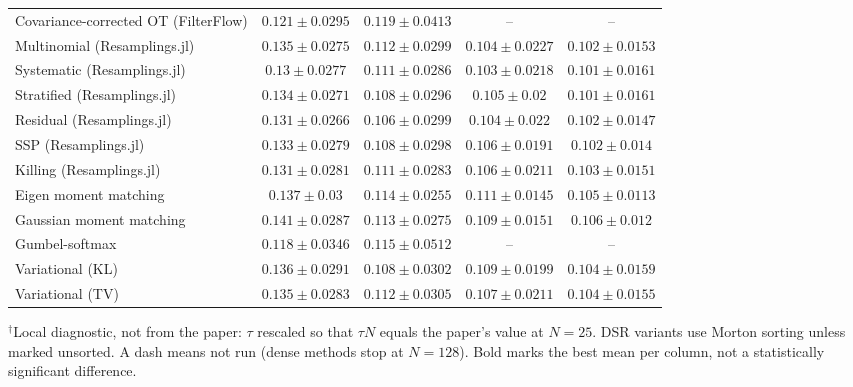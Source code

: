 \begin{table}[H]
\begin{adjustbox}{max width=\linewidth}
\begin{tabular}{lcccc}
Covariance-corrected OT (FilterFlow) & $0.121\pm0.0295$ & $0.119\pm0.0413$ & -- & -- \\
Multinomial (Resamplings.jl) & $0.135\pm0.0275$ & $0.112\pm0.0299$ & $0.104\pm0.0227$ & $0.102\pm0.0153$ \\
Systematic (Resamplings.jl) & $0.13\pm0.0277$ & $0.111\pm0.0286$ & $0.103\pm0.0218$ & $0.101\pm0.0161$ \\
Stratified (Resamplings.jl) & $0.134\pm0.0271$ & $0.108\pm0.0296$ & $0.105\pm0.02$ & $0.101\pm0.0161$ \\
Residual (Resamplings.jl) & $0.131\pm0.0266$ & $0.106\pm0.0299$ & $0.104\pm0.022$ & $0.102\pm0.0147$ \\
SSP (Resamplings.jl) & $0.133\pm0.0279$ & $0.108\pm0.0298$ & $0.106\pm0.0191$ & $0.102\pm0.014$ \\
Killing (Resamplings.jl) & $0.131\pm0.0281$ & $0.111\pm0.0283$ & $0.106\pm0.0211$ & $0.103\pm0.0151$ \\
Eigen moment matching & $0.137\pm0.03$ & $0.114\pm0.0255$ & $0.111\pm0.0145$ & $0.105\pm0.0113$ \\
Gaussian moment matching & $\mathbf{0.141\pm0.0287}$ & $0.113\pm0.0275$ & $0.109\pm0.0151$ & $0.106\pm0.012$ \\
Gumbel-softmax & $0.118\pm0.0346$ & $0.115\pm0.0512$ & -- & -- \\
Variational (KL) & $0.136\pm0.0291$ & $0.108\pm0.0302$ & $0.109\pm0.0199$ & $0.104\pm0.0159$ \\
Variational (TV) & $0.135\pm0.0283$ & $0.112\pm0.0305$ & $0.107\pm0.0211$ & $0.104\pm0.0155$ \\
\bottomrule
\end{tabular}
\end{adjustbox}
\par\smallskip\parbox{0.95\linewidth}{\footnotesize $^\dagger$Local diagnostic, not from the paper: $\tau$ rescaled so that $\tau N$ equals the paper's value at $N{=}25$. DSR variants use Morton sorting unless marked unsorted. A dash means not run (dense methods stop at $N{=}128$). Bold marks the best mean per column, not a statistically significant difference.}
\end{table}

